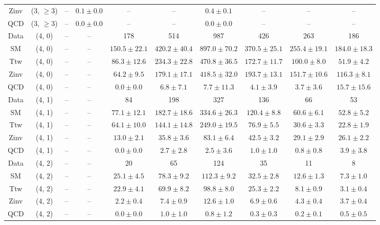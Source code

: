 \begin{table}[h!]
{\begin{tabular}{cccccccccc}
	Zinv & (3, $\ge3$) & -- & $0.1\pm 0.0$ & -- & -- & $0.4\pm 0.1$ & -- & -- & -- \\[0.5ex] 
	QCD & (3, $\ge3$) & -- & $0.0\pm 0.0$ & -- & -- & $0.0\pm 0.0$ & -- & -- & -- \\[0.5ex] 
	Data & (4, 0) & -- & -- & 178 & 514 & 987 & 426 & 263 & 186 \\[0.5ex] 
	SM & (4, 0) & -- & -- & $150.5\pm 22.1$ & $420.2\pm 40.4$ & $897.0\pm 70.2$ & $370.5\pm 25.1$ & $255.4\pm 19.1$ & $184.0\pm 18.3$ \\[0.5ex] 
	Ttw & (4, 0) & -- & -- & $86.3\pm 12.6$ & $234.3\pm 22.8$ & $470.8\pm 36.5$ & $172.7\pm 11.7$ & $100.0\pm 8.0$ & $51.9\pm 4.2$ \\[0.5ex] 
	Zinv & (4, 0) & -- & -- & $64.2\pm 9.5$ & $179.1\pm 17.1$ & $418.5\pm 32.0$ & $193.7\pm 13.1$ & $151.7\pm 10.6$ & $116.3\pm 8.1$ \\[0.5ex] 
	QCD & (4, 0) & -- & -- & $0.0\pm 0.0$ & $6.8\pm 7.1$ & $7.7\pm 11.3$ & $4.1\pm 3.9$ & $3.7\pm 3.6$ & $15.7\pm 15.6$ \\[0.5ex] 
	Data & (4, 1) & -- & -- & 84 & 198 & 327 & 136 & 66 & 53 \\[0.5ex] 
	SM & (4, 1) & -- & -- & $77.1\pm 12.1$ & $182.7\pm 18.6$ & $334.6\pm 26.3$ & $120.4\pm 8.8$ & $60.6\pm 6.1$ & $52.8\pm 5.2$ \\[0.5ex] 
	Ttw & (4, 1) & -- & -- & $64.1\pm 10.0$ & $144.1\pm 14.8$ & $249.0\pm 19.5$ & $76.9\pm 5.5$ & $30.6\pm 3.3$ & $22.8\pm 1.9$ \\[0.5ex] 
	Zinv & (4, 1) & -- & -- & $13.0\pm 2.1$ & $35.8\pm 3.6$ & $83.1\pm 6.4$ & $42.5\pm 3.2$ & $29.1\pm 2.9$ & $26.1\pm 2.2$ \\[0.5ex] 
	QCD & (4, 1) & -- & -- & $0.0\pm 0.0$ & $2.7\pm 2.8$ & $2.5\pm 3.6$ & $1.0\pm 1.0$ & $0.8\pm 0.8$ & $3.9\pm 3.8$ \\[0.5ex] 
	Data & (4, 2) & -- & -- & 20 & 65 & 124 & 35 & 11 & 8 \\[0.5ex] 
	SM & (4, 2) & -- & -- & $25.1\pm 4.5$ & $78.3\pm 9.2$ & $112.3\pm 9.2$ & $32.5\pm 2.8$ & $12.6\pm 1.3$ & $7.3\pm 1.0$ \\[0.5ex] 
	Ttw & (4, 2) & -- & -- & $22.9\pm 4.1$ & $69.9\pm 8.2$ & $98.8\pm 8.0$ & $25.3\pm 2.2$ & $8.1\pm 0.9$ & $3.1\pm 0.4$ \\[0.5ex] 
	Zinv & (4, 2) & -- & -- & $2.2\pm 0.4$ & $7.4\pm 0.9$ & $12.6\pm 1.0$ & $6.9\pm 0.6$ & $4.3\pm 0.4$ & $3.7\pm 0.4$ \\[0.5ex] 
	QCD & (4, 2) & -- & -- & $0.0\pm 0.0$ & $1.0\pm 1.0$ & $0.8\pm 1.2$ & $0.3\pm 0.3$ & $0.2\pm 0.1$ & $0.5\pm 0.5$ \\[0.5ex] 

\end{tabular}}
\end{table}
